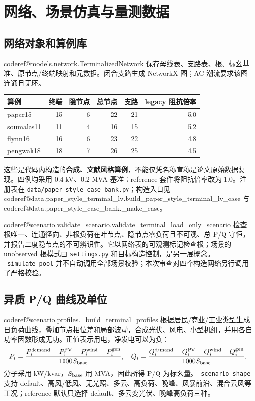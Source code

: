 \documentclass[UTF8,11pt,a4paper,fontset=windows]{ctexart}
\makeatletter
\newcommand{\CodeRef}[1]{\begingroup\small\csname coderef@#1\endcsname\endgroup}
\makeatother
\begin{document}
\section{网络、场景仿真与量测数据}
\subsection{网络对象和算例库}
\CodeRef{models.network.TerminalizedNetwork} 保存母线表、支路表、根、标幺基准、原节点/终端映射和元数据。闭合支路生成 NetworkX 图；AC 潮流要求该图连通且无环。

\begin{center}\begin{tabular}{lrrrrr}\toprule
算例 & 终端 & 隐节点 & 总节点 & 支路 & legacy 阻抗倍率\\\midrule
paper15 & 15 & 6 & 22 & 21 & 5.0\\
soumalas11 & 11 & 4 & 16 & 15 & 5.2\\
flynn16 & 16 & 6 & 23 & 22 & 4.8\\
pengwah18 & 18 & 7 & 26 & 25 & 4.5\\\bottomrule
\end{tabular}\end{center}
这些是代码内构造的\textbf{合成、文献风格算例}，不能仅凭名称宣称是论文原始数据复现。四例均采用 0.4 kV、0.2 MVA 基准；reference 套件将阻抗倍率改为 1.0。注册表在 \nolinkurl{data/paper_style_case_bank.py}；构造入口见 \CodeRef{data.paper_style_terminal_lv.build_paper_style_terminal_lv_case} 与 \CodeRef{data.paper_style_case_bank._make_case}。

\CodeRef{scenario.validate_scenario.validate_terminal_load_only_scenario} 检查根唯一、连通径向、非根负荷在叶节点、隐节点零负荷且不可观、总 P/Q 守恒，并报告二度隐节点的不可辨识性。它以网络表的可观测标记检查根；场景的 unobserved 根模式由 \nolinkurl{settings.py} 和目标构造控制，是另一层概念。\nolinkurl{_simulate_pool} 并不自动调用全部场景校验；本次审查对四个构造网络另行调用了严格校验。

\subsection{异质 P/Q 曲线及单位}
\CodeRef{scenario.profiles._build_terminal_profiles} 根据居民/商业/工业类型生成日负荷曲线，叠加节点相位差和局部波动，合成光伏、风电、小型机组，并用各自功率因数形成无功。正值表示用电，净发电可以为负：
\[
P_i=\frac{P_i^{\rm demand}-P_i^{\rm PV}-P_i^{\rm wind}-P_i^{\rm gen}}{1000 S_{\rm base}},\quad
Q_i=\frac{Q_i^{\rm demand}-Q_i^{\rm PV}-Q_i^{\rm wind}-Q_i^{\rm gen}}{1000 S_{\rm base}}.
\]
分子采用 kW/kvar，$S_{\rm base}$ 用 MVA，因此所得 P/Q 为标幺量。\nolinkurl{_scenario_shape} 支持 default、高风/低风、无光照、多云、高负荷、晚峰、风暴前沿、混合云风等工况；reference 默认只选择 default、多云变光伏、晚峰高负荷三种。
\end{document}
